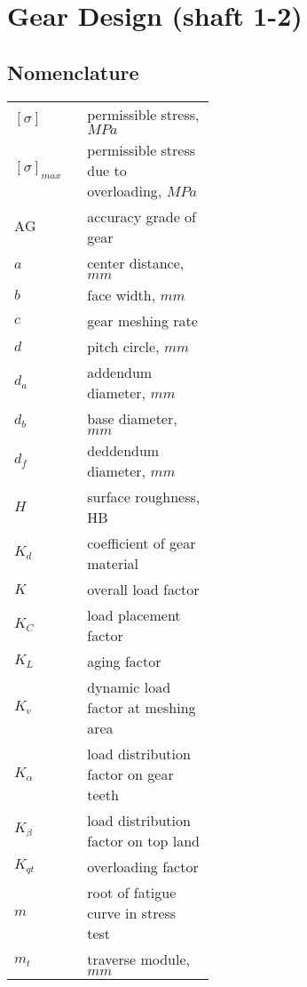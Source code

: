 \chapter{Gear Design (shaft 1-2)}
\section*{Nomenclature}
\begin{tabular}[t]{p{0.1\linewidth}p{0.35\linewidth}}
	$ [\sigma] $ & permissible stress, $ \unit{MPa} $\\
	$ [\sigma]_{max} $ & permissible stress due to overloading, $ \unit{MPa} $\\
	$ \text{AG} $ & accuracy grade of gear\\
	$ a $ & center distance, $ \unit{mm} $\\
	$ b $ & face width, $ \unit{mm} $\\
	$ c $ & gear meshing rate\\
	$ d $ & pitch circle, $ \unit{mm} $\\
	$ d_a $ & addendum diameter, $ \unit{mm} $\\
	$ d_b $ & base diameter, $ \unit{mm} $\\
	$ d_f $ & deddendum diameter, $ \unit{mm} $\\
	$ H $ & surface roughness, HB\\
	$ K_d $ & coefficient of gear material\\	
	$ K $ & overall load factor\\
	$ K_{C} $ & load placement factor\\
	$ K_{L} $ & aging factor\\
	$ K_{v} $ & dynamic load factor at meshing area\\
	$ K_{\alpha} $ & load distribution factor on gear teeth\\
	$ K_{\beta} $ & load distribution factor on top land\\
	$ K_{qt} $ & overloading factor\\
	$ m $ & root of fatigue curve in stress test\\
	$ m_t $ & traverse module, $ \unit{mm} $\\
	
\end{tabular}
